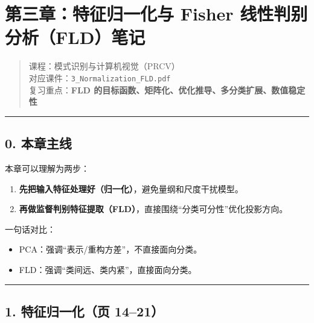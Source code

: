 \section{第三章：特征归一化与 Fisher
线性判别分析（FLD）笔记}\label{ux7b2cux4e09ux7ae0ux7279ux5f81ux5f52ux4e00ux5316ux4e0e-fisher-ux7ebfux6027ux5224ux522bux5206ux6790fldux7b14ux8bb0}

\begin{quote}
课程：模式识别与计算机视觉（PRCV）\\
对应课件：\texttt{3\_Normalization\_FLD.pdf}\\
复习重点：\textbf{FLD
的目标函数、矩阵化、优化推导、多分类扩展、数值稳定性}
\end{quote}

\begin{center}\rule{0.5\linewidth}{0.5pt}\end{center}

\subsection{0. 本章主线}\label{ux672cux7ae0ux4e3bux7ebf}

本章可以理解为两步：

\begin{enumerate}
\def\labelenumi{\arabic{enumi}.}
\tightlist
\item
  \textbf{先把输入特征处理好（归一化）}，避免量纲和尺度干扰模型。\\
\item
  \textbf{再做监督判别特征提取（FLD）}，直接围绕``分类可分性''优化投影方向。
\end{enumerate}

一句话对比：

\begin{itemize}
\tightlist
\item
  PCA：强调``表示/重构方差''，不直接面向分类。
\item
  FLD：强调``类间远、类内紧''，直接面向分类。
\end{itemize}

\begin{center}\rule{0.5\linewidth}{0.5pt}\end{center}

\subsection{1. 特征归一化（页
14--21）}\label{ux7279ux5f81ux5f52ux4e00ux5316ux9875-1421}

